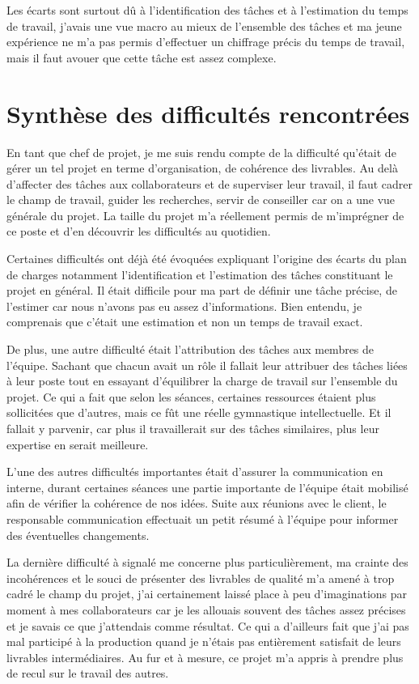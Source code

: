 Les écarts sont surtout dû à l'identification des tâches et à l'estimation du temps de travail, j'avais une vue macro au mieux de l'ensemble des tâches et ma jeune expérience ne m'a pas permis d'effectuer un chiffrage précis du temps de travail, mais il faut avouer que cette tâche est assez complexe.

\section{Synthèse des difficultés rencontrées}

          En tant que chef de projet, je me suis rendu compte de la difficulté qu'était de gérer un tel projet en terme d'organisation, de cohérence des livrables. Au delà d'affecter des tâches aux collaborateurs et de superviser leur  travail, il faut cadrer le champ de travail, guider les recherches, servir de conseiller car on a une vue générale du projet. La taille du projet m'a réellement permis de m'imprégner de ce poste et d'en découvrir les difficultés au quotidien. 

         Certaines difficultés ont déjà été évoquées expliquant l'origine des écarts du plan de charges notamment l'identification et l'estimation des tâches constituant le projet en général. Il était difficile pour ma part de définir une tâche précise, de l'estimer car nous n'avons pas eu assez d'informations. Bien
entendu, je comprenais que c'était une estimation et non un temps de travail exact. 

          De plus, une autre difficulté était l'attribution des tâches aux membres de l'équipe. Sachant que chacun avait un rôle il fallait leur attribuer des tâches liées à leur poste tout en essayant d'équilibrer la charge de travail sur l'ensemble du projet. Ce qui a fait que selon les séances, certaines ressources étaient plus sollicitées que d'autres, mais ce fût une réelle gymnastique intellectuelle. Et il fallait y parvenir, car plus il travaillerait sur des tâches similaires, plus leur expertise en serait meilleure.

         L'une des autres difficultés importantes était d'assurer la communication en interne, durant certaines séances une partie importante de l'équipe était mobilisé afin de vérifier la cohérence de nos idées. Suite aux réunions avec le client, le responsable communication effectuait un petit résumé à l'équipe pour informer des éventuelles changements.

        La dernière difficulté à signalé me concerne plus particulièrement, ma crainte des incohérences et le souci de présenter des livrables de qualité m'a amené à trop cadré le champ du projet, j'ai certainement laissé place à peu d'imaginations par moment à mes collaborateurs car je les allouais souvent des tâches assez précises et je savais ce que j'attendais comme résultat. Ce qui a d'ailleurs fait que j'ai pas mal participé à la production quand je n'étais pas entièrement satisfait de leurs livrables intermédiaires. Au fur et à mesure, ce projet m'a appris à prendre plus de recul sur le travail des autres.

